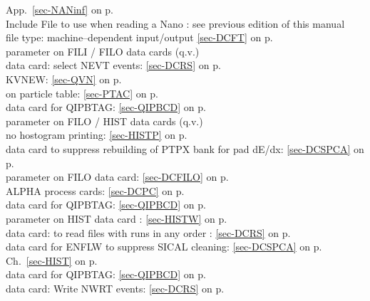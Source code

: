  App.~\ref{sec-NANinf} on p.~\pageref{sec-NANinf}\\
 Include File to use when reading a Nano :
      see previous edition of this manual           \\
 file type: machine--dependent input/output
 \ref{sec-DCFT} on p.~\pageref{sec-DCFT}\\
 parameter on FILI / FILO data cards (q.v.)\\
 data card: select NEVT events: \ref{sec-DCRS} on p.~\pageref{sec-DCRS}\\
 KVNEW: \ref{sec-QVN} on p.~\pageref{sec-QVN}\\
 on particle table: \ref{sec-PTAC} on p.~\pageref{sec-PTAC}\\
 data card for QIPBTAG: \ref{sec-QIPBCD} on p.~\pageref{sec-QIPBCD}\\
 parameter on FILO / HIST data cards (q.v.)\\
 no hostogram printing: \ref{sec-HISTP} on p.~\pageref{sec-HISTP}\\
 data card to suppress rebuilding of PTPX bank for pad dE/dx: \ref{sec-DCSPCA} on p.~\pageref{sec-DCSPCA}\\
 parameter on FILO data card: \ref{sec-DCFILO} on p.~\pageref{sec-DCFILO}\\
 ALPHA process cards: \ref{sec-DCPC} on p.~\pageref{sec-DCPC}\\
 data card for QIPBTAG: \ref{sec-QIPBCD} on p.~\pageref{sec-QIPBCD}\\
 parameter on HIST data card : \ref{sec-HISTW} on p.~\pageref{sec-HISTW}\\
 data card: to read files with runs in any order :
  \ref{sec-DCRS} on p.~\pageref{sec-DCRS}\\
 data card for ENFLW to suppress SICAL cleaning: \ref{sec-DCSPCA} on p.~\pageref{sec-DCSPCA}\\
 Ch.~\ref{sec-HIST} on p.~\pageref{sec-HIST}\\
 data card for QIPBTAG: \ref{sec-QIPBCD} on p.~\pageref{sec-QIPBCD}\\
 data card: Write  NWRT events: \ref{sec-DCRS} on p.~\pageref{sec-DCRS}
 
